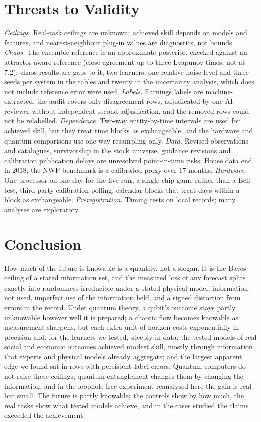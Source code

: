 \documentclass[journal]{IEEEtran}
\theoremstyle{definition}
\begin{document}
\section{Threats to Validity}\label{sec:threats}
\emph{Ceilings.} Real-task ceilings are unknown; achieved skill depends on models and features, and nearest-neighbour plug-in values are diagnostics, not bounds. \emph{Chaos.} The ensemble reference is an approximate posterior, checked against an attractor-aware reference (close agreement up to three Lyapunov times, not at 7.2); chaos results are gaps to it; two learners, one relative noise level and three seeds per system in the tables and twenty in the uncertainty analysis, which does not include reference error were used. \emph{Labels.} Earnings labels are machine-extracted, the audit covers only disagreement rows, adjudicated by one AI reviewer without independent second adjudication, and the removed rows could not be relabelled. \emph{Dependence.} Two-way entity-by-time intervals are used for achieved skill, but they treat time blocks as exchangeable, and the hardware and quantum comparisons use one-way resampling only. \emph{Data.} Revised observations and catalogues, survivorship in the stock universe, guidance revisions and calibration publication delays are unresolved point-in-time risks; House data end in 2018; the NWP benchmark is a calibrated proxy over 17 months. \emph{Hardware.} One processor on one day for the live run, a single-chip game rather than a Bell test, third-party calibration polling, calendar blocks that treat days within a block as exchangeable. \emph{Preregistration.} Timing rests on local records; many analyses are exploratory.

\section{Conclusion}
How much of the future is knowable is a quantity, not a slogan. It is the Bayes ceiling of a stated information set, and the measured loss of any forecast splits exactly into randomness irreducible under a stated physical model, information not used, imperfect use of the information held, and a signed distortion from errors in the record. Under quantum theory, a qubit's outcome stays partly unknowable however well it is prepared; a chaotic flow becomes knowable as measurement sharpens, but each extra unit of horizon costs exponentially in precision and, for the learners we tested, steeply in data; the tested models of real social and economic outcomes achieved modest skill, mostly through information that experts and physical models already aggregate; and the largest apparent edge we found sat in rows with persistent label errors. Quantum computers do not raise these ceilings; quantum entanglement changes them by changing the information, and in the loophole-free experiment reanalysed here the gain is real but small. The future is partly knowable; the controls show by how much, the real tasks show what tested models achieve, and in the cases studied the claims exceeded the achievement.
\end{document}
